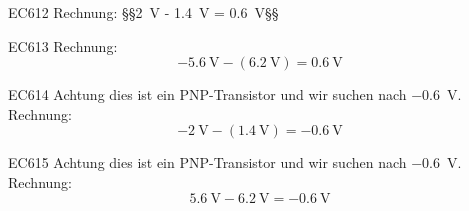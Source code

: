 \begin{sol}{EC612}
  Rechnung: §§\SI{2}{\volt} - \SI{1.4}{\volt} = \SI{0.6}{\volt}§§ 
\end{sol}

\begin{sol}{EC613}
  Rechnung: $$\SI{-5.6}{\volt} - (\SI{6.2}{\volt}) = \SI{0.6}{\volt} $$
\end{sol}

\begin{sol}{EC614}
  Achtung dies ist ein PNP-Transistor und wir suchen nach \SI{-0.6}{\volt}.
  Rechnung: $$\SI{-2}{\volt} - (\SI{1.4}{\volt}) = \SI{-0.6}{\volt} $$
\end{sol}

\begin{sol}{EC615}
  Achtung dies ist ein PNP-Transistor und wir suchen nach \SI{-0.6}{\volt}.
  Rechnung: $$\SI{5.6}{\volt} - \SI{6.2}{\volt} = \SI{-0.6}{\volt} $$
\end{sol}

